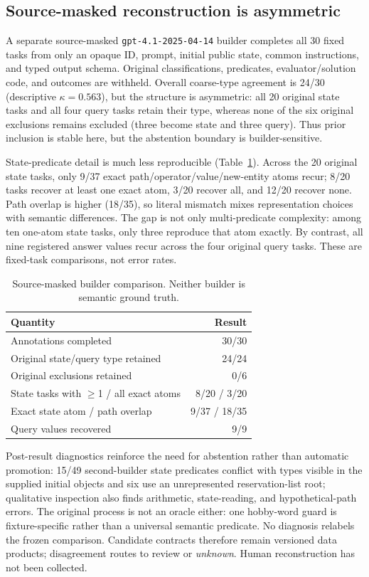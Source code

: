 \subsection{Source-masked reconstruction is asymmetric}
\label{sec:second-builder}
A separate source-masked \texttt{gpt-4.1-2025-04-14} builder completes all 30 fixed tasks from only an opaque ID, prompt, initial public state, common instructions, and typed output schema. Original classifications, predicates, evaluator/solution code, and outcomes are withheld. Overall coarse-type agreement is 24/30 (descriptive $\kappa=0.563$), but the structure is asymmetric: all 20 original state tasks and all four query tasks retain their type, whereas none of the six original exclusions remains excluded (three become state and three query). Thus prior inclusion is stable here, but the abstention boundary is builder-sensitive.

State-predicate detail is much less reproducible (Table~\ref{tab:second-builder}). Across the 20 original state tasks, only 9/37 exact path/operator/value/new-entity atoms recur; 8/20 tasks recover at least one exact atom, 3/20 recover all, and 12/20 recover none. Path overlap is higher (18/35), so literal mismatch mixes representation choices with semantic differences. The gap is not only multi-predicate complexity: among ten one-atom state tasks, only three reproduce that atom exactly. By contrast, all nine registered answer values recur across the four original query tasks. These are fixed-task comparisons, not error rates.

\begin{table}[t]
\centering\small
\caption{Source-masked builder comparison. Neither builder is semantic ground truth.}
\label{tab:second-builder}
\begin{tabular}{@{}lr@{}}
\toprule
Quantity & Result \\
\midrule
Annotations completed & 30/30 \\
Original state/query type retained & 24/24 \\
Original exclusions retained & 0/6 \\
State tasks with $\geq$1 / all exact atoms & 8/20 / 3/20 \\
Exact state atom / path overlap & 9/37 / 18/35 \\
Query values recovered & 9/9 \\
\bottomrule
\end{tabular}
\end{table}

Post-result diagnostics reinforce the need for abstention rather than automatic promotion: 15/49 second-builder state predicates conflict with types visible in the supplied initial objects and six use an unrepresented reservation-list root; qualitative inspection also finds arithmetic, state-reading, and hypothetical-path errors. The original process is not an oracle either: one hobby-word guard is fixture-specific rather than a universal semantic predicate. No diagnosis relabels the frozen comparison. Candidate contracts therefore remain versioned data products; disagreement routes to review or \emph{unknown}. Human reconstruction has not been collected.
